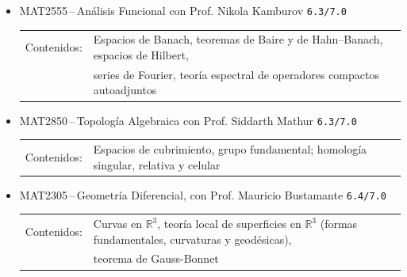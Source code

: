 \documentclass[10pt,a4paper]{article}
\begin{document}
\begin{itemize}
    \item {MAT2555\,--\,Análisis Funcional con Prof. Nikola Kamburov} \hfill \texttt{6.3/7.0}
    \newline \vspace*{0.25cm}
    \begin{tabular}{rl}
    Contenidos:& Espacios de Banach, teoremas de Baire y de Hahn--Banach, espacios de Hilbert, \\
    & series de Fourier, teoría espectral de operadores compactos autoadjuntos
    \end{tabular}

    \item {MAT2850\,--\,Topolog\'ia Algebraica con Prof. Siddarth Mathur} \hfill \texttt{6.3/7.0}
    \newline \vspace*{0.25cm}
    \begin{tabular}{rl}
    Contenidos:& Espacios de cubrimiento, grupo fundamental; homología singular, relativa y celular
    \end{tabular}



    \item {MAT2305\,--\,Geometría Diferencial, con Prof. Mauricio Bustamante} \hfill \texttt{6.4/7.0}
    \newline \vspace*{0.25cm}
    \begin{tabular}{rl}
    Contenidos:& Curvas en \(\mathbb{R}^3\), teoría local de superficies en \(\mathbb{R}^3\) (formas fundamentales, curvaturas y geodésicas), \\
    & teorema de Gauss-Bonnet
    \end{tabular}

\end{itemize}
\end{document}
